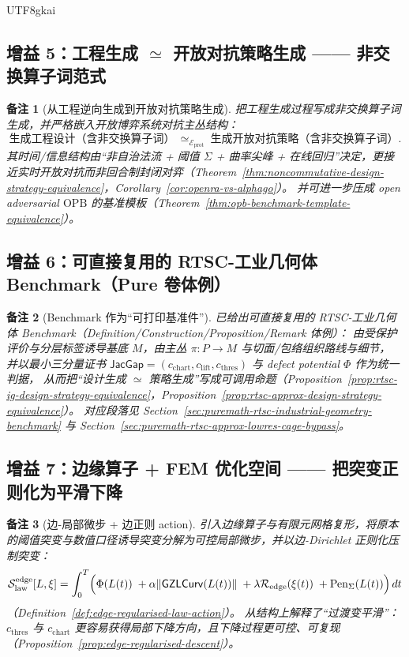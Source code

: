 \documentclass[12pt]{article}
\newtheorem{remark}{备注}[section]
\newcommand{\GZLCurv}{\ensuremath{\mathsf{GZLCurv}}}
\newcommand{\JacGap}{\ensuremath{\mathsf{JacGap}}}
\newcommand{\OPB}{\ensuremath{\mathrm{OPB}}}
\newcommand{\RTSC}{\textsf{RTSC}}
\begin{document}
\begin{CJK*}{UTF8}{gkai}
\subsection{增益 5：工程生成 $\simeq$ 开放对抗策略生成 —— 非交换算子词范式}

\begin{remark}[从工程逆向生成到开放对抗策略生成]
把工程生成过程写成非交换算子词生成，并严格嵌入开放博弈系统对抗主丛结构：
\[
\text{生成工程设计（含非交换算子词）}
\ \simeq_{\mathcal{E}_{\mathrm{prot}}}\
\text{生成开放对抗策略（含非交换算子词）}.
\]
其时间/信息结构由“非自治法流 + 阈值 $\Sigma$ + 曲率尖峰 + 在线回归”决定，更接近实时开放对抗而非回合制封闭对弈（Theorem~\ref{thm:noncommutative-design-strategy-equivalence}，Corollary~\ref{cor:openra-vs-alphago}）。
并可进一步压成 open adversarial \OPB{} 的基准模板（Theorem~\ref{thm:opb-benchmark-template-equivalence}）。
\end{remark}

\subsection{增益 6：可直接复用的 \RTSC{}-工业几何体 Benchmark（Pure 卷体例）}

\begin{remark}[Benchmark 作为“可打印基准件”]
已给出可直接复用的 \RTSC{}-工业几何体 Benchmark（Definition/Construction/Proposition/Remark 体例）：
由受保护评价与分层标签诱导基底 $M$，由主丛 $\pi:P\to M$ 与切面/包络组织路线与细节，
并以最小三分量证书 $\JacGap=(c_{\mathrm{chart}},c_{\mathrm{lift}},c_{\mathrm{thres}})$ 与 defect potential $\Phi$ 作为统一判据，
从而把“设计生成 $\simeq$ 策略生成”写成可调用命题（Proposition~\ref{prop:rtsc-ig-design-strategy-equivalence}，Proposition~\ref{prop:rtsc-approx-design-strategy-equivalence}）。
对应段落见 Section~\ref{sec:puremath-rtsc-industrial-geometry-benchmark} 与 Section~\ref{sec:puremath-rtsc-approx-lowres-cage-bypass}。
\end{remark}

\subsection{增益 7：边缘算子 + FEM 优化空间 —— 把突变正则化为平滑下降}

\begin{remark}[边-局部微步 + 边正则 action]
引入边缘算子与有限元网格复形，将原本的阈值突变与数值口径诱导突变分解为可控局部微步，并以边-Dirichlet 正则化压制突变：
\[
\mathcal{S}_{\mathrm{law}}^{\mathrm{edge}}[L,\xi]
=
\int_0^T
\Bigl(
\Phi(L(t))
\;+\alpha\|\GZLCurv(L(t))\|
\;+\lambda\mathcal{R}_{\mathrm{edge}}(\xi(t))
\;+\mathrm{Pen}_{\Sigma}(L(t))
\Bigr)\,dt
\]
（Definition~\ref{def:edge-regularised-law-action}）。
从结构上解释了“过渡变平滑”：$c_{\mathrm{thres}}$ 与 $c_{\mathrm{chart}}$ 更容易获得局部下降方向，且下降过程更可控、可复现（Proposition~\ref{prop:edge-regularised-descent}）。
\end{remark}


\end{CJK*}
\end{document}
